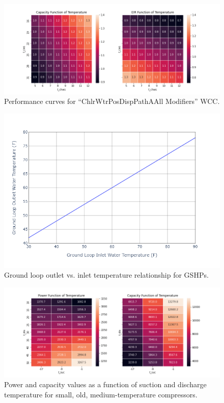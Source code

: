 \begin{figure}
    \centering \includegraphics[width=1.0\textwidth]{figures/ChlrWtrPosDispPathAAll_Modifiers.png}
    \caption{Performance curves for ``ChlrWtrPosDispPathAAll Modifiers'' WCC.}
    \label{fig:wcc_ChlrWtrPosDispPathAAll_Modifiers}
\end{figure}

\begin{figure}
    \centering \includegraphics[width=1.0\textwidth]{figures/ground_loop_outlet_temperatures.png}
    \caption{Ground loop outlet vs. inlet temperature relationship for GSHPs.}
    \label{fig:gshp_loop_temps}
\end{figure}


\begin{figure}
    \centering \includegraphics[width=1.0\textwidth]{figures/refrigeration_MTold.png}
    \caption[Compressor performance for small, old, medium temperature compressors]{Power and capacity values as a function of suction and discharge temperature for small, old, medium-temperature compressors.}
    \label{fig:refrig_mt_old}
\end{figure}


